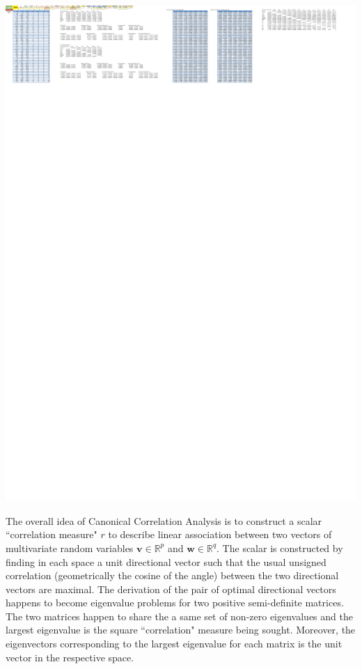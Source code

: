 \documentclass[article]{jss}
\begin{document}
        \begin{center}
          \vspace{-20pt}\includegraphics[width=\linewidth,keepaspectratio=true]{img/CanCorrSheetOutput}
        \end{center}
        The overall idea of Canonical Correlation \cite{hotelling1936relations} Analysis is to construct a scalar ``correlation measure" $r$ to describe linear association between two vectors of multivariate random variables $\textbf{v}\in\mathbb{R}^p$ and $\textbf{w}\in\mathbb{R}^q$. The scalar is constructed by finding in each space a unit directional vector such that the usual unsigned correlation (geometrically the cosine of the angle) between the two directional vectors are maximal. The derivation of the pair of optimal directional vectors happens to become eigenvalue problems for two positive semi-definite matrices. The two matrices happen to share the a same set of non-zero eigenvalues and the largest eigenvalue is the square ``correlation" measure being sought. Moreover, the eigenvectors corresponding to the largest eigenvalue for each matrix is the unit vector in the respective space.
\end{document}
